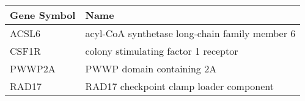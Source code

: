 \begin{tabular}{ll}
\toprule
Gene Symbol &                                           Name \\
\midrule
      ACSL6 & acyl-CoA synthetase long-chain family member 6 \\
      CSF1R &           colony stimulating factor 1 receptor \\
     PWWP2A &                      PWWP domain containing 2A \\
      RAD17 &        RAD17 checkpoint clamp loader component \\
\bottomrule
\end{tabular}
